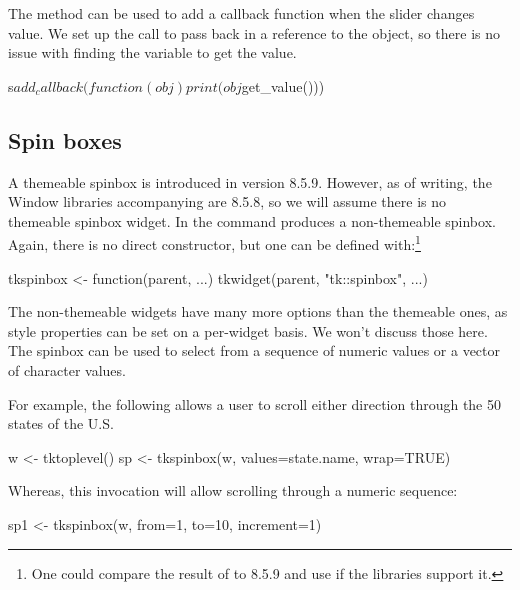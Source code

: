 The  method can be used to add a callback function
when the slider changes value. We set up the call to pass back in a
reference to the object, so there is no issue with finding the \TCL\/
variable to get the value.
\begin{Schunk}
\begin{Sinput}
 s$add_callback(function(obj) print(obj$get_value()))
\end{Sinput}
\end{Schunk}


\subsection{Spin boxes}
\label{sec:tcltk:spinboxes}

A themeable spinbox is introduced in \TK\/ version 8.5.9. However,  as of
writing, the Window libraries accompanying \R{} are 8.5.8, so we will
assume there is no themeable spinbox widget. In \TK\/ the
 command produces a non-themeable spinbox. Again, there
is no direct  constructor, but one can be
defined with:\footnote{One could compare the result of
   to 8.5.9 and use
   if the libraries support it.}
\begin{Schunk}
\begin{Sinput}
 tkspinbox <- function(parent, ...) 
     tkwidget(parent, "tk::spinbox", ...)
\end{Sinput}
\end{Schunk}

The non-themeable widgets have many more options than the themeable
ones, as style properties can be set on a per-widget basis. We won't
discuss those here. The spinbox can be used to select from a sequence
of numeric values or a vector of character values.


For example, the following allows a user to scroll either direction through the 50
states of the U.S.

\begin{Schunk}
\begin{Sinput}
 w <- tktoplevel()
 sp <- tkspinbox(w, values=state.name, wrap=TRUE)
\end{Sinput}
\end{Schunk}

Whereas, this invocation will allow scrolling through a numeric sequence:
\begin{Schunk}
\begin{Sinput}
 sp1 <- tkspinbox(w, from=1, to=10, increment=1)
\end{Sinput}
\end{Schunk}



